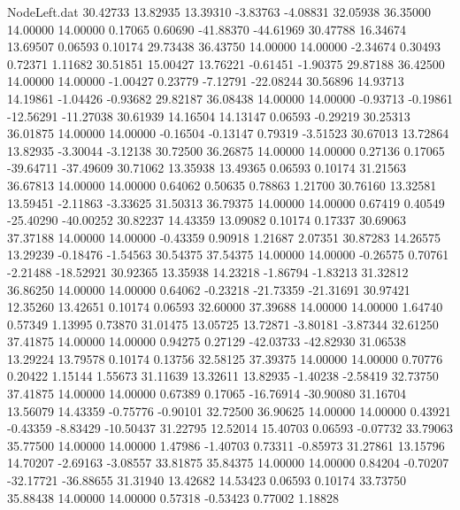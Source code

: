 \begin{filecontents}{NodeLeft.dat}
  30.42733   13.82935   13.39310    -3.83763   -4.08831   32.05938   36.35000   14.00000   14.00000    0.17065    0.60690  -41.88370  -44.61969
  30.47788   16.34674   13.69507     0.06593    0.10174   29.73438   36.43750   14.00000   14.00000   -2.34674    0.30493    0.72371    1.11682
  30.51851   15.00427   13.76221    -0.61451   -1.90375   29.87188   36.42500   14.00000   14.00000   -1.00427    0.23779   -7.12791  -22.08244
  30.56896   14.93713   14.19861    -1.04426   -0.93682   29.82187   36.08438   14.00000   14.00000   -0.93713   -0.19861  -12.56291  -11.27038
  30.61939   14.16504   14.13147     0.06593   -0.29219   30.25313   36.01875   14.00000   14.00000   -0.16504   -0.13147    0.79319   -3.51523
  30.67013   13.72864   13.82935    -3.30044   -3.12138   30.72500   36.26875   14.00000   14.00000    0.27136    0.17065  -39.64711  -37.49609
  30.71062   13.35938   13.49365     0.06593    0.10174   31.21563   36.67813   14.00000   14.00000    0.64062    0.50635    0.78863    1.21700
  30.76160   13.32581   13.59451    -2.11863   -3.33625   31.50313   36.79375   14.00000   14.00000    0.67419    0.40549  -25.40290  -40.00252
  30.82237   14.43359   13.09082     0.10174    0.17337   30.69063   37.37188   14.00000   14.00000   -0.43359    0.90918    1.21687    2.07351
  30.87283   14.26575   13.29239    -0.18476   -1.54563   30.54375   37.54375   14.00000   14.00000   -0.26575    0.70761   -2.21488  -18.52921
  30.92365   13.35938   14.23218    -1.86794   -1.83213   31.32812   36.86250   14.00000   14.00000    0.64062   -0.23218  -21.73359  -21.31691
  30.97421   12.35260   13.42651     0.10174    0.06593   32.60000   37.39688   14.00000   14.00000    1.64740    0.57349    1.13995    0.73870
  31.01475   13.05725   13.72871    -3.80181   -3.87344   32.61250   37.41875   14.00000   14.00000    0.94275    0.27129  -42.03733  -42.82930
  31.06538   13.29224   13.79578     0.10174    0.13756   32.58125   37.39375   14.00000   14.00000    0.70776    0.20422    1.15144    1.55673
  31.11639   13.32611   13.82935    -1.40238   -2.58419   32.73750   37.41875   14.00000   14.00000    0.67389    0.17065  -16.76914  -30.90080
  31.16704   13.56079   14.43359    -0.75776   -0.90101   32.72500   36.90625   14.00000   14.00000    0.43921   -0.43359   -8.83429  -10.50437
  31.22795   12.52014   15.40703     0.06593   -0.07732   33.79063   35.77500   14.00000   14.00000    1.47986   -1.40703    0.73311   -0.85973
  31.27861   13.15796   14.70207    -2.69163   -3.08557   33.81875   35.84375   14.00000   14.00000    0.84204   -0.70207  -32.17721  -36.88655
  31.31940   13.42682   14.53423     0.06593    0.10174   33.73750   35.88438   14.00000   14.00000    0.57318   -0.53423    0.77002    1.18828

\end{filecontents}
